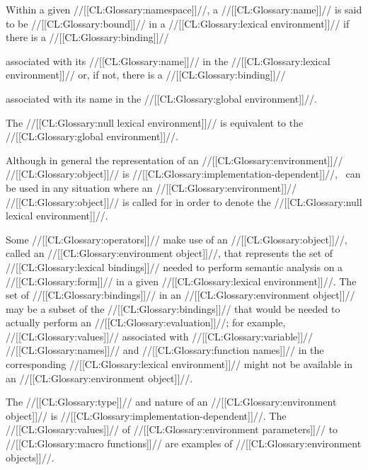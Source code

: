 Within a given //[[CL:Glossary:namespace]]//,
a //[[CL:Glossary:name]]// is said to be //[[CL:Glossary:bound]]// in a //[[CL:Glossary:lexical environment]]//
if there is a //[[CL:Glossary:binding]]// 

associated with its //[[CL:Glossary:name]]//
in the //[[CL:Glossary:lexical environment]]// or, if not, there is a //[[CL:Glossary:binding]]// 

associated with its name in the //[[CL:Glossary:global environment]]//.


The //[[CL:Glossary:null lexical environment]]// is equivalent to the //[[CL:Glossary:global environment]]//.

Although in general the representation of an //[[CL:Glossary:environment]]// //[[CL:Glossary:object]]//
is //[[CL:Glossary:implementation-dependent]]//, \nil\ can be used in any situation where an
//[[CL:Glossary:environment]]// //[[CL:Glossary:object]]// is called for in order to denote 
the //[[CL:Glossary:null lexical environment]]//.

\endsubsubsubsection%

\endsubsubsection%


Some //[[CL:Glossary:operators]]// make use of an //[[CL:Glossary:object]]//, 
called an //[[CL:Glossary:environment object]]//,
that represents the set of //[[CL:Glossary:lexical bindings]]// needed to perform
semantic analysis on a //[[CL:Glossary:form]]// in a given //[[CL:Glossary:lexical environment]]//.
The set of //[[CL:Glossary:bindings]]// in an //[[CL:Glossary:environment object]]//
may be a subset of the //[[CL:Glossary:bindings]]// that would be needed to actually 
perform an //[[CL:Glossary:evaluation]]//; for example, //[[CL:Glossary:values]]// associated with
//[[CL:Glossary:variable]]// //[[CL:Glossary:names]]// and //[[CL:Glossary:function names]]// in the corresponding
//[[CL:Glossary:lexical environment]]// might not be available in an //[[CL:Glossary:environment object]]//.

The //[[CL:Glossary:type]]// and nature of an //[[CL:Glossary:environment object]]// is //[[CL:Glossary:implementation-dependent]]//.
The //[[CL:Glossary:values]]// of //[[CL:Glossary:environment parameters]]// to //[[CL:Glossary:macro functions]]//
are examples of //[[CL:Glossary:environment objects]]//.

